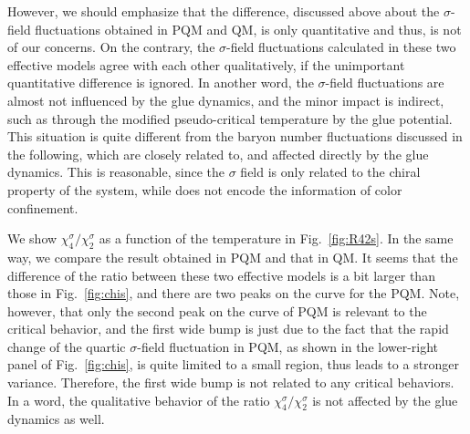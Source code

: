 \documentclass[final,5p,times,twocolumn,colorlinks=true,citecolor=blue,linkcolor=blue]{elsarticle}
\def\Fig#1{Fig.~\ref{#1}} \def\Tab#1{Tab.~\ref{#1}}
\begin{document}
However, we should emphasize that the difference, discussed above about the $\sigma$-field fluctuations obtained in PQM and QM, is only quantitative and thus, is not of our concerns. On the contrary, the $\sigma$-field fluctuations calculated in these two effective models agree with each other qualitatively, if the unimportant quantitative difference is ignored. In another word, the $\sigma$-field fluctuations are almost not influenced by the glue dynamics, and the minor impact is indirect, such as through the modified pseudo-critical temperature by the glue potential. This situation is quite different from the baryon number fluctuations discussed in the following, which are closely related to, and affected directly by the glue dynamics. This is reasonable, since the $\sigma$ field is only related to the chiral property of the system, while does not encode the information of color confinement.

We show $\chi_4^{\sigma}/\chi_2^{\sigma}$ as a function of the temperature in \Fig{fig:R42s}. In the same way, we compare the result obtained in PQM and that in QM. It seems that the difference of the ratio between these two effective models is a bit larger than those in \Fig{fig:chis}, and there are two peaks on the curve for the PQM. Note, however, that only the second peak on the curve of PQM is relevant to the critical behavior, and the first wide bump is just due to the fact that the rapid change of the quartic $\sigma$-field fluctuation in PQM, as shown in the lower-right panel of \Fig{fig:chis}, is quite limited to a small region, thus leads to a stronger variance. Therefore, the first wide bump is not related to any critical behaviors. In a word, the qualitative behavior of the ratio $\chi_4^{\sigma}/\chi_2^{\sigma}$ is not affected by the glue dynamics as well.
\end{document}
